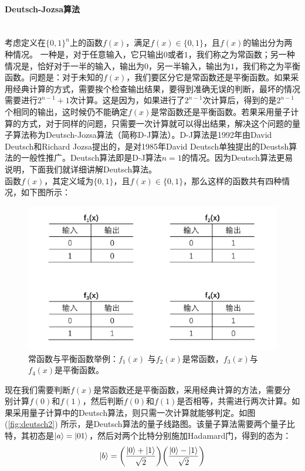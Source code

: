 \documentclass[a4paper]{article}
\begin{document}
\paragraph{Deutsch-Jozsa算法}~\\
考虑定义在$ \{0,1\}^n $上的函数$ f(x) $，满足$ f(x)\in \{0, 1\} $，且$ f(x) $的输出分为两种情况。
一种是，对于任意输入，它只输出$ 0 $或者$ 1$，我们称之为常函数；另一种情况是，恰好对于一半的输入，输出为$ 0 $，另一半输入，输出为$ 1 $，我们称之为平衡函数。问题是：对于未知的$ f(x) $，我们要区分它是常函数还是平衡函数。如果采用经典计算的方式，需要挨个检查输出结果，要得到准确无误的判断，最坏的情况需要进行$ 2^{n-1} + 1  $次计算。这是因为，如果进行了$ 2^{n-1} $次计算后，得到的是$ 2^{n-1} $个相同的输出，这时候仍不能确定$ f(x)  $是常函数还是平衡函数。若果采用量子计算的方式，对于同样的问题，只需要一次计算就可以得出结果，解决这个问题的量子算法称为Deutsch-Jozsa算法（简称D-J算法）。D-J算法是1992年由David Deutsch和Richard Jozsa提出的\cite{Deutsch1992Rapid}，是对1985年David Deutsch单独提出的Deustsh算法的一般性推广。Deutsch算法即是D-J算法$ n=1  $的情况。因为Deutsch算法更易说明，下面我们就详细讲解Deutsch算法。\\
函数$ f(x) $，其定义域为$ \{0,1\} $，且$ f(x)\in\{0,1\} $，那么这样的函数共有四种情况，如下图所示：
\begin{figure}[H]
	\centering
	\includegraphics[width=0.65\linewidth]{fig/deutsch.jpg}
	\caption{常函数与平衡函数举例：$ f_1(x) $ 与$ f_2(x)  $是常函数，$ f_3(x) $与$ f_4(x) $是平衡函数。}
	\label{fig:deutsch}
\end{figure}
现在我们需要判断$ f(x)  $是常函数还是平衡函数，采用经典计算的方法，需要分
别计算$ f(0)  $和$ f(1) $，然后判断$ f(0)  $和$ f(1)  $是否相等，共需进行两次计算。如果采用量子计算中的Deutsch算法，则只需一次计算就能够判定。如图 (\ref{fig:deutsch2}) 所示，是Deutsch算法的量子线路图。该量子算法需要两个量子比特，其初态是$ \ket{a} = \ket{01} $，然后对两个比特分别施加Hadamard门，得到的态为：
\begin{equation}\label{key}
\ket{b} = \qty(\dfrac{\ket{0} + \ket{1}}{\sqrt{2}}) \qty(\dfrac{\ket{0} - \ket{1}}{\sqrt{2}})
\end{equation}
\end{document}
